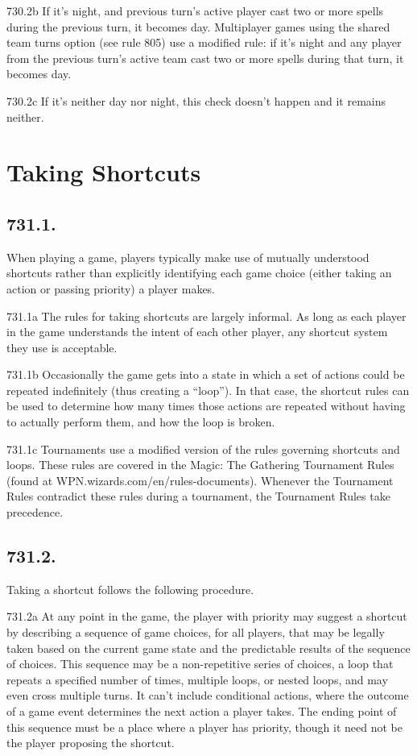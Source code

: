 730.2b If it’s night, and previous turn’s active player cast two or more spells during the previous turn, it becomes day. Multiplayer games using the shared team turns option (see rule 805) use a modified rule: if it’s night and any player from the previous turn’s active team cast two or more spells during that turn, it becomes day.

730.2c If it’s neither day nor night, this check doesn’t happen and it remains neither.

\section{Taking Shortcuts}
\subsection*{731.1.}
When playing a game, players typically make use of mutually understood shortcuts rather than explicitly identifying each game choice (either taking an action or passing priority) a player makes.

731.1a The rules for taking shortcuts are largely informal. As long as each player in the game understands the intent of each other player, any shortcut system they use is acceptable.

731.1b Occasionally the game gets into a state in which a set of actions could be repeated indefinitely (thus creating a “loop”). In that case, the shortcut rules can be used to determine how many times those actions are repeated without having to actually perform them, and how the loop is broken.

731.1c Tournaments use a modified version of the rules governing shortcuts and loops. These rules are covered in the Magic: The Gathering Tournament Rules (found at WPN.wizards.com/en/rules-documents). Whenever the Tournament Rules contradict these rules during a tournament, the Tournament Rules take precedence.

\subsection*{731.2.}
Taking a shortcut follows the following procedure.

731.2a At any point in the game, the player with priority may suggest a shortcut by describing a sequence of game choices, for all players, that may be legally taken based on the current game state and the predictable results of the sequence of choices. This sequence may be a non-repetitive series of choices, a loop that repeats a specified number of times, multiple loops, or nested loops, and may even cross multiple turns. It can’t include conditional actions, where the outcome of a game event determines the next action a player takes. The ending point of this sequence must be a place where a player has priority, though it need not be the player proposing the shortcut.

